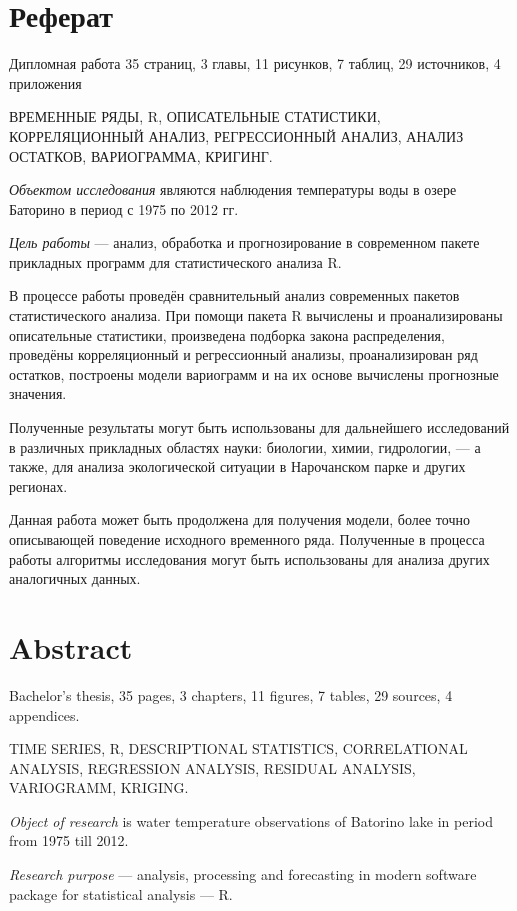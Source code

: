
\newpage

\chapter*{Реферат}
Дипломная работа 35 страниц, 3 главы, 11 рисунков, 7 таблиц, 29 источников, 4 приложения

ВРЕМЕННЫЕ РЯДЫ, R, ОПИСАТЕЛЬНЫЕ СТАТИСТИКИ, КОРРЕЛЯЦИОННЫЙ АНАЛИЗ, РЕГРЕССИОННЫЙ АНАЛИЗ, АНАЛИЗ ОСТАТКОВ, ВАРИОГРАММА, КРИГИНГ.

\textit{Объектом исследования} являются наблюдения температуры воды в озере Баторино в период с 1975 по 2012 гг.

\textit{Цель работы} --- анализ, обработка и прогнозирование в современном пакете прикладных программ для статистического анализа R.

В процессе работы проведён сравнительный анализ современных пакетов статистического анализа. При помощи пакета R вычислены и проанализированы описательные статистики, произведена подборка закона распределения, проведёны корреляционный и регрессионный анализы, проанализирован ряд остатков, построены модели вариограмм и на их основе вычислены прогнозные значения.

Полученные результаты могут быть использованы для дальнейшего исследований в различных прикладных областях науки: биологии, химии, гидрологии, --- а также, для анализа экологической ситуации в Нарочанском парке и других регионах.

Данная работа может быть продолжена для получения модели, более точно описывающей поведение исходного временного ряда. Полученные в процесса работы алгоритмы исследования могут быть использованы для анализа других аналогичных данных.

\newpage

\chapter*{Abstract}
Bachelor's thesis, 35 pages, 3 chapters, 11 figures, 7 tables, 29 sources, 4 appendices.

TIME SERIES, R, DESCRIPTIONAL STATISTICS, CORRELATIONAL ANALYSIS, REGRESSION ANALYSIS, RESIDUAL ANALYSIS, VARIOGRAMM, KRIGING.

\textit{Object of research} is water temperature observations of Batorino lake in period from 1975 till 2012.

\textit{Research purpose} --- analysis, processing and forecasting in modern software package for statistical analysis --- R.

